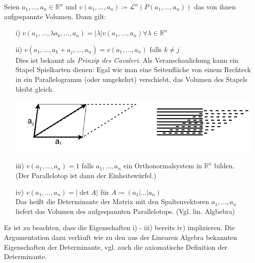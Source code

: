 \begin{satz}
    \mbox{}
    Seien $a_1, \ldots, a_n \in \mathbb{R}^n$ und $v(a_1, \ldots , a_n) \coloneqq \mathcal{L}^n (P (a_1, \ldots, a_n))$ das von ihnen aufgespannte Volumen. Dann gilt:
    \begin{enumerate}
        \item[i)]
            $v(a_1, \ldots, \lambda a_k, \ldots, a_n) = 
            |\lambda| v(a_1, \ldots, a_n) \forall \lambda \in \mathbb{R}^n $
        \item[ii)]
            $v(a_1, \ldots, a_k + a_j, \ldots, a_n) = v(a_1, \ldots, a_n) $
            falls $k \neq j $ \\
            \linebreak
            Dies ist bekannt als \emph{Prinzip des Cavaleri}. Als Veranschaulichung kann
            ein Stapel Spielkarten dienen: Egal wie man eine Seitenfläche von einem Rechteck
            in ein Parallelogramm (oder umgekehrt) verschiebt, 
            das Volumen des Stapels bleibt gleich. \\
            \begin{center}
            	\includegraphics[scale=0.5]{pictures/004-01.png}
            \end{center}
        \item[iii)]
            $v(a_1, \ldots, a_n) = 1 $ falls $a_1, \ldots, a_n $ ein Orthonormalsystem
            in $\mathbb{R}^n $ bilden. \\
            (Der Parallelotop ist dann der Einheitswürfel.)
        \item[iv)]
            $v(a_1, \ldots, a_n) = |\det A|$ für $A \coloneqq (a_1 | \ldots | a_n) $ \\
            \linebreak
            Das heißt die Determinante der Matrix mit den Spaltenvektoren $a_1, \ldots, a_n$
            liefert das Volumen des aufgespannten Parallelotops. (Vgl. lin. Algbebra)
    \end{enumerate}
\end{satz}

    Es ist zu beachten, dass die Eigenschaften i) - iii) bereits iv) implizieren. Die Argumentation
    dazu verläuft wie zu den aus der Linearen Algebra bekannten Eigenschaften der Determinante, vgl.
    auch die axiomatische Definition der Determinante.

